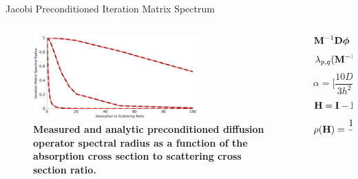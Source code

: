 \documentclass{beamer}
\begin{document}
\begin{frame}{Jacobi Preconditioned Iteration Matrix Spectrum}

  \begin{columns}

    \begin{column}{0.5\textwidth}
      \begin{figure}[t!]
        \begin{center}
          \includegraphics[width=2.5in,clip]{measured_spec_rad_2.pdf}
        \end{center}
        \caption{\textbf{Measured and analytic preconditioned diffusion
            operator spectral radius as a function of the absorption cross
            section to scattering cross section ratio.}}
      \end{figure}
    \end{column}

    \begin{column}{0.5\textwidth}
      \[
        \mathbf{M}^{-1} \mathbf{D} \boldsymbol{\phi} = \mathbf{M}^{-1} \mathbf{s}
      \]
      \medskip
      \[
        \lambda_{p,q}(\mathbf{M}^{-1} \mathbf{D}) = \alpha \lambda_{p,q}(\mathbf{D})
      \]
      \medskip
      \[
      \alpha = \Bigg[\frac{10 D}{3 h^2} + \Sigma_a\Bigg]^{-1}
      \]
      \medskip
      \[
        \mathbf{H} = \mathbf{I} - \mathbf{M}^{-1} \mathbf{D}
      \]
      \medskip
      \[
        \rho(\mathbf{H}) = \frac{10 \alpha D}{3 h^2}
      \]
    \end{column}

  \end{columns}

\end{frame}
\end{document}
